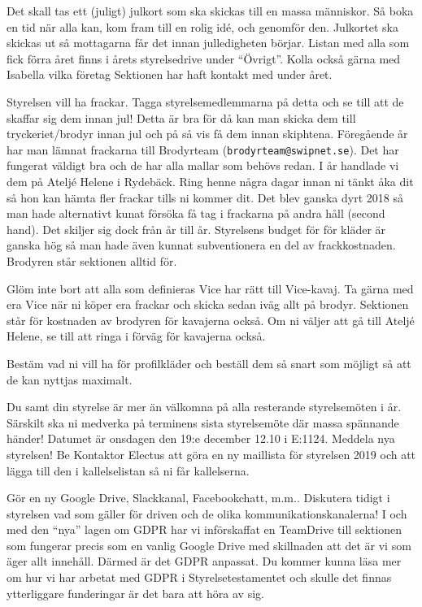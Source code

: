 \documentclass[10pt]{article}
\begin{document}
\begin{numplist}
    \item Det skall tas ett (juligt) julkort som ska skickas till en massa människor. Så boka en tid när alla kan, kom fram till en rolig idé, och genomför den. Julkortet ska skickas ut så mottagarna får det innan julledigheten börjar. Listan med alla som fick förra året finns i årets styrelsedrive under ``Övrigt''. Kolla också gärna med Isabella vilka företag Sektionen har haft kontakt med under året.
    
    \item Styrelsen vill ha frackar. Tagga styrelsemedlemmarna på detta och se till att de skaffar sig dem innan jul! Detta är bra för då kan man skicka dem till tryckeriet/brodyr innan jul och på så vis få dem innan skiphtena. Föregående år har man lämnat frackarna till Brodyrteam (\texttt{brodyrteam@swipnet.se}). Det har fungerat väldigt bra och de har alla mallar som behövs redan. I år handlade vi dem på Ateljé Helene i Rydebäck. Ring henne några dagar innan ni tänkt åka dit så hon kan hämta fler frackar tills ni kommer dit. Det blev ganska dyrt 2018 så man hade alternativt kunat försöka få tag i frackarna på andra håll (second hand). Det skiljer sig dock från år till år. Styrelsens budget för för kläder är ganska hög så man hade även kunnat subventionera en del av frackkostnaden. Brodyren står sektionen alltid för.
    
    \item Glöm inte bort att alla som definieras Vice har rätt till Vice-kavaj. Ta gärna med era Vice när ni köper era frackar och skicka sedan iväg allt på brodyr. Sektionen står för kostnaden av brodyren för kavajerna också. Om ni väljer att gå till Ateljé Helene, se till att ringa i förväg för kavajerna också.

    \item Bestäm vad ni vill ha för profilkläder och beställ dem så snart som möjligt så att de kan nyttjas maximalt.
    
    \item Du samt din styrelse är mer än välkomna på alla resterande styrelsemöten i år. Särskilt ska ni medverka på terminens sista styrelsemöte där massa spännande händer! Datumet är onsdagen den 19:e december 12.10 i E:1124. Meddela nya styrelsen! Be Kontaktor Electus att göra en ny maillista för styrelsen 2019 och att lägga till den i kallelselistan så ni får kallelserna.
    
    \item Gör en ny Google Drive, Slackkanal, Facebookchatt, m.m.. Diskutera tidigt i styrelsen vad som gäller för driven och de olika kommunikationskanalerna! I och med den ``nya'' lagen om GDPR har vi införskaffat en TeamDrive till sektionen som fungerar precis som en vanlig Google Drive med skillnaden att det är vi som äger allt innehåll. Därmed är det GDPR anpassat. Du kommer kunna läsa mer om hur vi har arbetat med GDPR i Styrelsetestamentet och skulle det finnas ytterliggare funderingar är det bara att höra av sig.
    

\end{numplist}
\end{document}
